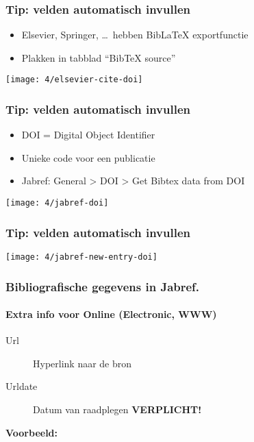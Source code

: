 \documentclass[aspectratio=169]{beamer}
\begin{document}
\begin{frame}
  \frametitle{Tip: velden automatisch invullen}

  \begin{itemize}
    \item Elsevier, Springer, \ldots\ hebben Bib\LaTeX{} exportfunctie
    \item Plakken in tabblad ``BibTeX source''
  \end{itemize}

  \bigskip

  \centering
  \texttt{[image: 4/elsevier-cite-doi]}

\end{frame}

\begin{frame}
  \frametitle{Tip: velden automatisch invullen}

  \begin{itemize}
    \item DOI = Digital Object Identifier
    \item Unieke code voor een publicatie
    \item Jabref: General > DOI > Get Bibtex data from DOI
  \end{itemize}

  \bigskip

  \centering
  \texttt{[image: 4/jabref-doi]}

\end{frame}

\begin{frame}[plain]
  \frametitle{Tip: velden automatisch invullen}

  \centering
  \texttt{[image: 4/jabref-new-entry-doi]}

\end{frame}

\begin{frame}[plain]
  \frametitle{Bibliografische gegevens in Jabref.}
  \framesubtitle{Extra info voor Online (Electronic, WWW)}

  \begin{description}
    \item[Url] Hyperlink naar de bron
    \item[Urldate] Datum van raadplegen \textbf{VERPLICHT!}
  \end{description}

  \bigskip

  \textbf{Voorbeeld:}

  \bigskip


\end{frame}
\end{document}
